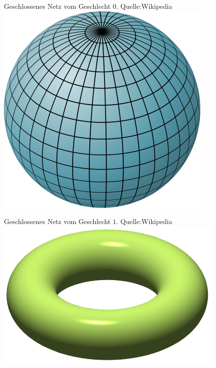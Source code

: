 \documentclass[]{article}
\begin{document}
\begin{figure}[H]
\centering
Geschlossenes Netz vom Geschlecht $0$. Quelle:Wikipedia \\
\includegraphics[scale=0.2]{Sphere.png}
\end{figure}


\begin{figure}[H]
\centering
Geschlossenes Netz vom Geschlecht $1$. Quelle:Wikipedia \\
\includegraphics[scale=0.8]{Torus.png}
\end{figure}
\end{document}
